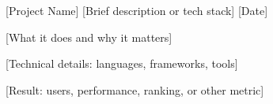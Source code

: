 

\begin{cventries}

  \cventry
    {[Project Name]} %
    {[Brief description or tech stack]} %
    {} %
    {[Date]} %
    {
      \begin{cvitems}
        \item {[What it does and why it matters]}
        \item {[Technical details: languages, frameworks, tools]}
        \item {[Result: users, performance, ranking, or other metric]}
      \end{cvitems}
    }

\end{cventries}
